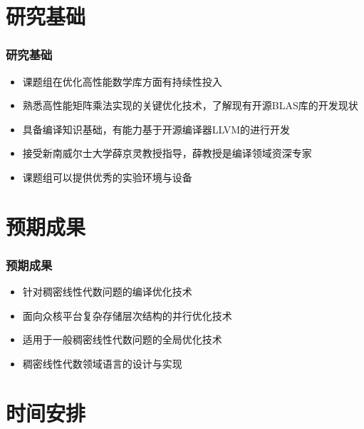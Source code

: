\documentclass[aspectratio=169]{beamer}
\begin{document}
\section{研究基础}

\begin{frame}
  \frametitle{研究基础}
  \begin{itemize}
  \item 课题组在优化高性能数学库方面有持续性投入
  \item 熟悉高性能矩阵乘法实现的关键优化技术，了解现有开源BLAS库的开发现状
  \item 具备编译知识基础，有能力基于开源编译器LLVM的进行开发
  \item 接受新南威尔士大学薛京灵教授指导，薛教授是编译领域资深专家
  \item 课题组可以提供优秀的实验环境与设备
  \end{itemize}
\end{frame}

\section{预期成果}

\begin{frame}
  \frametitle{预期成果}
  \begin{itemize}
  \item 针对稠密线性代数问题的编译优化技术
  \item 面向众核平台复杂存储层次结构的并行优化技术
  \item 适用于一般稠密线性代数问题的全局优化技术
  \item 稠密线性代数领域语言的设计与实现
  \end{itemize}
\end{frame}

\section{时间安排}
\end{document}
